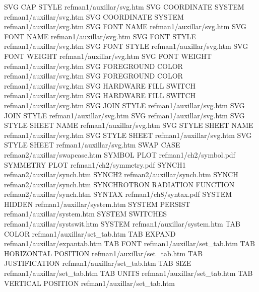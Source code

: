 SVG CAP STYLE                           refman1/auxillar/svg.htm
SVG COORDINATE SYSTEM                   refman1/auxillar/svg.htm
SVG COORDINATE SYSTEM                   refman1/auxillar/svg.htm
SVG FONT NAME                           refman1/auxillar/svg.htm
SVG FONT NAME                           refman1/auxillar/svg.htm
SVG FONT STYLE                          refman1/auxillar/svg.htm
SVG FONT STYLE                          refman1/auxillar/svg.htm
SVG FONT WEIGHT                         refman1/auxillar/svg.htm
SVG FONT WEIGHT                         refman1/auxillar/svg.htm
SVG FOREGROUND COLOR                    refman1/auxillar/svg.htm
SVG FOREGROUND COLOR                    refman1/auxillar/svg.htm
SVG HARDWARE FILL SWITCH                refman1/auxillar/svg.htm
SVG HARDWARE FILL SWITCH                refman1/auxillar/svg.htm
SVG JOIN STYLE                          refman1/auxillar/svg.htm
SVG JOIN STYLE                          refman1/auxillar/svg.htm
SVG                                     refman1/auxillar/svg.htm
SVG STYLE SHEET NAME                    refman1/auxillar/svg.htm
SVG STYLE SHEET NAME                    refman1/auxillar/svg.htm
SVG STYLE SHEET                         refman1/auxillar/svg.htm
SVG STYLE SHEET                         refman1/auxillar/svg.htm
SWAP CASE                               refman2/auxillar/swapcase.htm
SYMBOL PLOT                             refman1/ch2/symbol.pdf
SYMMETRY PLOT                           refman1/ch2/symmetry.pdf
SYNCH1                                  refman2/auxillar/synch.htm
SYNCH2                                  refman2/auxillar/synch.htm
SYNCH                                   refman2/auxillar/synch.htm
SYNCHROTRON RADIATION FUNCTION          refman2/auxillar/synch.htm
SYNTAX                                  refman1/ch8/syntax.pdf
SYSTEM HIDDEN                           refman1/auxillar/system.htm
SYSTEM PERSIST                          refman1/auxillar/system.htm
SYSTEM SWITCHES                         refman1/auxillar/systswit.htm
SYSTEM                                  refman1/auxillar/system.htm
TAB COLOR                               refman1/auxillar/set_tab.htm
TAB EXPAND                              refman1/auxillar/expantab.htm
TAB FONT                                refman1/auxillar/set_tab.htm
TAB HORIZONTAL POSITION                 refman1/auxillar/set_tab.htm
TAB JUSTIFICATION                       refman1/auxillar/set_tab.htm
TAB SIZE                                refman1/auxillar/set_tab.htm
TAB UNITS                               refman1/auxillar/set_tab.htm
TAB VERTICAL POSITION                   refman1/auxillar/set_tab.htm
